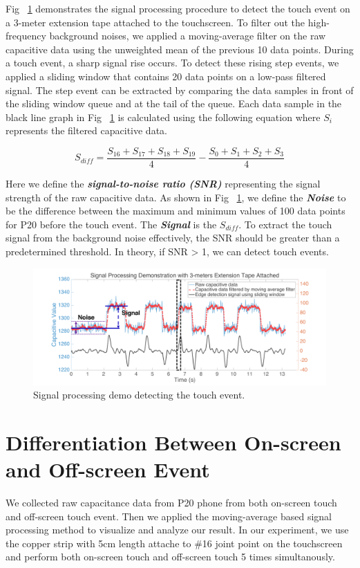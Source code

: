 Fig ~\ref{fig:processing} demonstrates the signal processing procedure to detect the touch event on a 3-meter extension tape attached to the touchscreen. To filter out the high-frequency background noises, we applied a moving-average filter on the raw capacitive data using the unweighted mean of the previous 10 data points. During a touch event, a sharp signal rise occurs. To detect these rising step events, we applied a sliding window that contains 20 data points on a low-pass filtered signal. The step event can be extracted by comparing the data samples in front of the sliding window queue and at the tail of the queue. Each data sample in the black line graph in Fig ~\ref{fig:processing} is calculated using the following equation where $S_{i}$ represents the filtered capacitive data. 

\begin{equation}
    S_{diff} = \frac{S_{16} + S_{17} + S_{18} + S_{19}}{4}  - \frac{S_{0} + S_{1} + S_{2} + S_{3}}{4}
\end{equation}

Here we define the \textbf{\textit{signal-to-noise ratio (SNR)}} representing the signal strength of the raw capacitive data. As shown in Fig ~\ref{fig:processing}, we define the \textbf{\textit{Noise}} to be the difference between the maximum and minimum values of 100 data points for P20 before the touch event. The \textbf{\textit{Signal}} is the $S_{diff}$. To extract the touch signal from the background noise effectively, the SNR should be greater than a predetermined threshold. In theory, if SNR > 1, we can detect touch events. 

\begin{figure}[ht]
    \centering
      \includegraphics[width=0.95\columnwidth]{figures/processing.png}
      \setlength{\belowcaptionskip}{-6pt}
      \caption{Signal processing demo  detecting the touch event.}
      \label{fig:processing}
\end{figure}

\section{Differentiation Between On-screen and Off-screen Event}
We collected raw capacitance data from P20 phone from both on-screen touch and off-screen touch event. Then we applied the moving-average based signal processing method to visualize and analyze our result. In our experiment, we use the copper strip with 5cm length attache to \#16 joint point on the touchscreen and perform both on-screen touch and off-screen touch 5 times simultanously.

